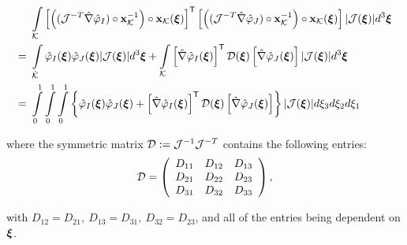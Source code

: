\begin{align}
                                        \ & \int\limits_{\mathcal{K}}
                                        \left[\left((\mathcal{J}^{-T}\hat{\nabla}\hat{\varphi}_I)\circ\mathbf{x}_{\mathcal{K}}^{-1}\right)\circ\mathbf{x}_{\mathcal{K}}(\boldsymbol{\xi})\right]^{\mathsf{T}} \left[\left((\mathcal{J}^{-T}\hat{\nabla}\hat{\varphi}_J)\circ\mathbf{x}_{\mathcal{K}}^{-1}\right)\circ\mathbf{x}_{\mathcal{K}}(\boldsymbol{\xi})\right]|\mathcal{J}(\boldsymbol{\xi})|d^3\boldsymbol{\xi} \nonumber\\
                                        =\ & \int\limits_{\hat{\mathcal{K}}}                \hat{\varphi}_I(\boldsymbol{\xi})\hat{\varphi}_J(\boldsymbol{\xi})|\mathcal{J}(\boldsymbol{\xi})|d^3\boldsymbol{\xi} +
                                        \int\limits_{\mathcal{K}}             \left[\hat{\nabla}\hat{\varphi}_I(\boldsymbol{\xi})\right]^{\mathsf{T}}\mathcal{D}(\boldsymbol{\xi})\left[\hat{\nabla}\hat{\varphi}_J(\boldsymbol{\xi})\right]|\mathcal{J}(\boldsymbol{\xi})|d^3\boldsymbol{\xi} \nonumber\\
                                        =\ & \int\limits_0^1\int\limits_0^1\int\limits_0^1\left\{\hat{\varphi}_I(\boldsymbol{\xi})\hat{\varphi}_J(\boldsymbol{\xi})+\left[\hat{\nabla}\hat{\varphi}_I(\boldsymbol{\xi})\right]^{\mathsf{T}}\mathcal{D}(\boldsymbol{\xi})\left[\hat{\nabla}\hat{\varphi}_J(\boldsymbol{\xi})\right]\right\}|\mathcal{J}(\boldsymbol{\xi})|d\xi_3d\xi_2d\xi_1
    \label{h1ip_coupled}
\end{align}

\noindent where the symmetric matrix $\mathcal{D}:=\mathcal{J}^{-1}\mathcal{J}^{-T}$ contains the following entries:
% 
\begin{equation}
    \mathcal{D}=\left(
    \begin{array}{ccc}
         D_{11} & D_{12} & D_{13}  \\
         D_{21} & D_{22} & D_{23}  \\
         D_{31} & D_{32} & D_{33}
    \end{array}\right),
    \label{def_D}
\end{equation}

\noindent with $D_{12}=D_{21},\ D_{13}=D_{31},\ D_{32}=D_{23}$, and all of the entries being dependent on $\boldsymbol{\xi}$.

